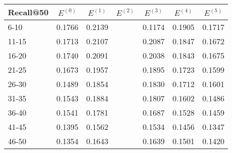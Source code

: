 \begin{table*}[]
    \begin{tabular}{|l|l|l|l|l|l|l|}
    \hline
    Recall@50 & \multicolumn{1}{c|}{$E^{(0)}$} & \multicolumn{1}{c|}{$E^{(1)}$} & \multicolumn{1}{c|}{$E^{(2)}$} & \multicolumn{1}{c|}{$E^{(3)}$} & \multicolumn{1}{c|}{$E^{(4)}$} & \multicolumn{1}{c|}{$E^{(5)}$} \\ \hline
    6-10      & 0.1766                         & 0.2139                         &                                & 0.1174                         & 0.1905                         & 0.1717                         \\ \hline
    11-15     & 0.1713                         & 0.2107                         &                                & 0.2087                         & 0.1847                         & 0.1672                         \\ \hline
    16-20     & 0.1740                         & 0.2091                         &                                & 0.2038                         & 0.1843                         & 0.1675                         \\ \hline
    21-25     & 0.1673                         & 0.1957                         &                                & 0.1895                         & 0.1723                         & 0.1599                         \\ \hline
    26-30     & 0.1489                         & 0.1854                         &                                & 0.1830                         & 0.1712                         & 0.1601                         \\ \hline
    31-35     & 0.1543                         & 0.1884                         &                                & 0.1807                         & 0.1602                         & 0.1486                         \\ \hline
    36-40     & 0.1541                         & 0.1781                         &                                & 0.1687                         & 0.1528                         & 0.1459                         \\ \hline
    41-45     & 0.1395                         & 0.1562                         &                                & 0.1534                         & 0.1456                         & 0.1347                         \\ \hline
    46-50     & 0.1354                         & 0.1643                         &                                & 0.1639                         & 0.1501                         & 0.1420                         \\ \hline

\end{tabular}
\end{table*}
